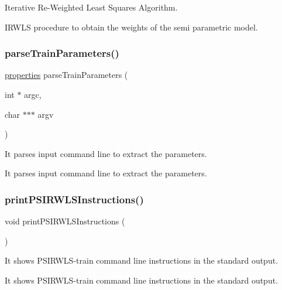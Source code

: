 Iterative Re-\/\+Weighted Least Squares Algorithm. 

I\+R\+W\+LS procedure to obtain the weights of the semi parametric model. \hypertarget{PSIRWLS-train_8h_a67566f6fd6aec7278ca360186af4e91b}{}\label{PSIRWLS-train_8h_a67566f6fd6aec7278ca360186af4e91b} 
\subsubsection{\texorpdfstring{parse\+Train\+Parameters()}{parseTrainParameters()}}
{\ttfamily \hyperlink{structproperties}{properties} parse\+Train\+Parameters (\begin{DoxyParamCaption}\item[{int $\ast$}]{argc,  }\item[{char $\ast$$\ast$$\ast$}]{argv }\end{DoxyParamCaption})}



It parses input command line to extract the parameters. 

It parses input command line to extract the parameters. \hypertarget{PSIRWLS-train_8h_af71e97e89750872ce608bffd01d2af41}{}\label{PSIRWLS-train_8h_af71e97e89750872ce608bffd01d2af41} 
\subsubsection{\texorpdfstring{print\+P\+S\+I\+R\+W\+L\+S\+Instructions()}{printPSIRWLSInstructions()}}
{\ttfamily void print\+P\+S\+I\+R\+W\+L\+S\+Instructions (\begin{DoxyParamCaption}{ }\end{DoxyParamCaption})}



It shows P\+S\+I\+R\+W\+L\+S-\/train command line instructions in the standard output. 

It shows P\+S\+I\+R\+W\+L\+S-\/train command line instructions in the standard output. \hypertarget{PSIRWLS-train_8h_a50a6e1f36a010feb91db9b9b38679948}{}\label{PSIRWLS-train_8h_a50a6e1f36a010feb91db9b9b38679948} 
